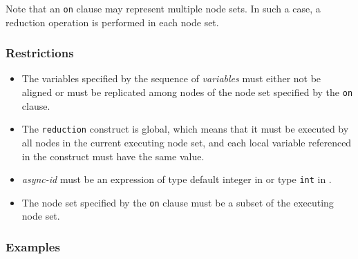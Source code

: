 Note that an {\tt on} clause may represent multiple node sets. In such a
case, a reduction operation is performed in each node set.

\subsubsection*{Restrictions}

\begin{itemize}
 \item The variables specified by the sequence of {\it variables} must
       either not be aligned or must be replicated among nodes of the node
       set specified by the {\tt on} clause.
 \item The {\tt reduction} construct is global, which means that it must
       be executed by all nodes in the current executing node set, and each local
       variable referenced in the construct must have the same value.
 \item {\it async-id} must be an expression of type default integer in
       {\XMPF} or type {\tt int} in {\XMPC}.
 \item The node set specified by the {\tt on} clause must be a subset of the
       executing node set.
\end{itemize}

\subsubsection*{Examples}

